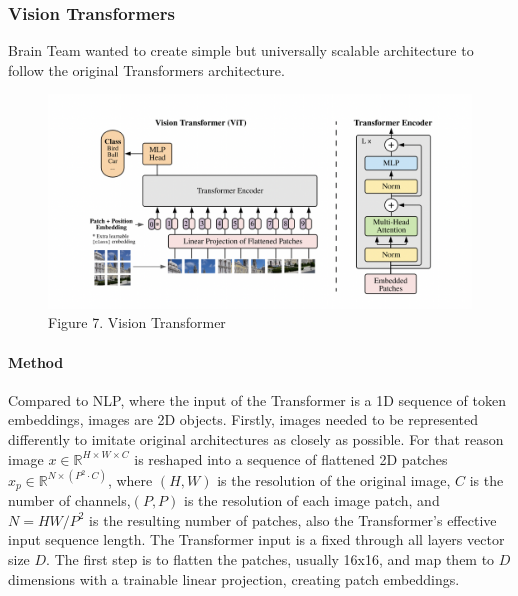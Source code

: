 \documentclass[
]{krantz}
\begin{document}
\hypertarget{vision-transformers}{%
\subsubsection{Vision Transformers}\label{vision-transformers}}

Brain Team wanted to create simple but universally scalable architecture to follow the original Transformers architecture.

\begin{figure}

{\centering \includegraphics[width=0.9\linewidth]{./figures/01-chapter1/ViT} 

}

\caption{Figure 7. Vision Transformer}\label{fig:ch01-figure7}
\end{figure}

\hypertarget{method}{%
\paragraph{Method}\label{method}}

Compared to NLP, where the input of the Transformer is a 1D sequence of token embeddings, images are 2D objects. Firstly, images needed to be represented differently to imitate original architectures as closely as possible. For that reason image \(x\in \mathbb{R}^{ H \times W \times C}\) is reshaped into a sequence of flattened 2D patches \(x_p\in \mathbb{R}^{ N \times \left( P^2 \cdot C \right)}\), where \(\left(H,W\right)\) is the resolution of the original image, \(C\) is the number of channels,\(\left(P,P\right)\) is the resolution of each image patch, and \(N =HW/P^2\) is the resulting number of patches, also the Transformer's effective input sequence length. The Transformer input is a fixed through all layers vector size \(D\). The first step is to flatten the patches, usually 16x16, and map them to \(D\) dimensions with a trainable linear projection, creating patch embeddings.
\end{document}
